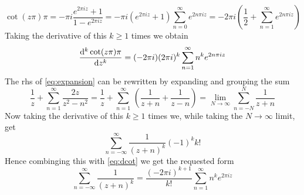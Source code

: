 \documentclass[a4paper,12pt]{article}
\begin{document}
\begin{equation}
	\cot(z\pi)\pi=-\pi i\frac{e^{2\pi iz}+1}{1-e^{2\pi iz}}=-\pi i\left(e^{2\pi iz}+1\right)\sum_{n=0}^{\infty}e^{2n\pi iz}=-2\pi i\left(\frac{1}{2}+\sum_{n=1}^{\infty}e^{2n\pi iz}\right)
\end{equation}
Taking the derivative of this $k\geq 1$ times we obtain
\begin{equation} \label{eq:dcot}
	\dv[k]{\cot(z\pi)\pi}{z}=(-2\pi i)(2\pi i)^{k}\sum_{n=1}^{\infty}n^k e^{2n\pi iz}
\end{equation}
The rhs of \eqref{eq:expansion} can be rewritten by expanding and grouping the sum
\begin{equation}
\frac{1}{z}+\sum_{n=1}^{\infty}\frac{2z}{z^2-n^2}=\frac{1}{z}+\sum_{n=1}^{\infty}\,\left(\frac{1}{z+n}+\frac{1}{z-n}\right)=\lim_{N\to\infty}\sum_{n=-N}^{N}\frac{1}{z+n}
\end{equation}
Now taking the derivative of this $k\geq 1$ times we, while taking the $N\to \infty $ limit, get
\begin{equation}
\sum_{n=-\infty}^{\infty}\frac{1}{(z+n)^k}(-1)^k k!
\end{equation}
Hence combinging this with \eqref{eq:dcot} we get the requested form
\begin{equation}
\sum_{n=-\infty}^{\infty}\frac{1}{(z+n)^k}=\frac{(-2\pi i)^{k+1}}{k!}\sum_{n=1}^{\infty}n^k e^{2\pi iz}
\end{equation}
\end{document}
